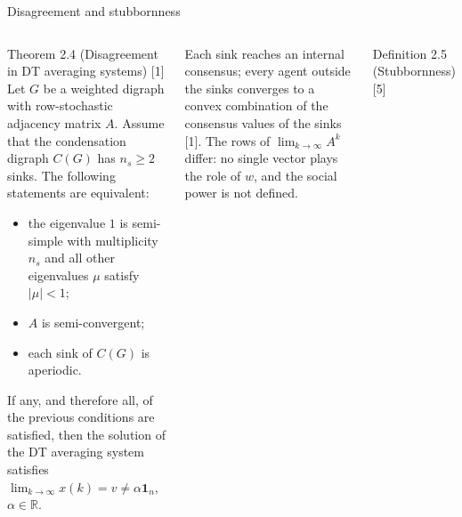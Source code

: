 \documentclass[10pt, aspectratio=169]{beamer}
\newcommand{\compactblocks}{\setbeamerfont{block title}{size=\small}}
\begin{document}
\begin{frame}[label=m-fdg-disagreement]{Disagreement and stubbornness}
  \compactblocks
  \begin{columns}[T]
      \begin{block}{Theorem 2.4 (Disagreement in DT averaging systems) [1]}
        \scriptsize
        Let $G$ be a weighted digraph with row-stochastic adjacency matrix $A$. Assume
        that the condensation digraph $C(G)$ has $n_s \geq 2$ sinks. The following
        statements are equivalent:
        \begin{itemize}
          \item[(A1)] the eigenvalue $1$ is semi-simple with multiplicity $n_s$ and all
                      other eigenvalues $\mu$ satisfy $|\mu| < 1$;
          \item[(A2)] $A$ is semi-convergent;
          \item[(A3)] each sink of $C(G)$ is aperiodic.
        \end{itemize}
        If any, and therefore all, of the previous conditions are satisfied, then the
        solution of the DT averaging system satisfies
        $\lim_{k \to \infty} x(k) = v \neq \alpha \mathbf{1}_n$, $\alpha \in \mathbb{R}$.
      \end{block}
      \scriptsize
      Each sink reaches an internal consensus; every agent outside the sinks converges to
      a convex combination of the consensus values of the sinks [1]. The rows of
      $\lim_{k \to \infty} A^k$ differ: no single vector plays the role of $w$, and
      \alert{the social power is not defined}.
      \begin{block}{Definition 2.5 (Stubbornness) [5]}

\end{block}
\end{columns}
\end{frame}
\end{document}
